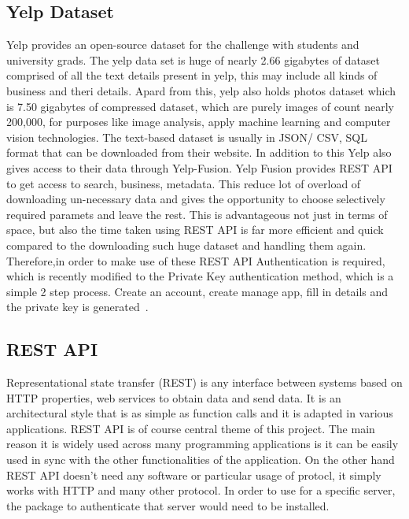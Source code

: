 \subsection{Yelp Dataset}

Yelp provides an open-source dataset for the challenge with students
and university grads. The yelp data set is huge of nearly 2.66
gigabytes of dataset comprised of all the text details present in
yelp, this may include all kinds of business and theri details. Apard
from this, yelp also holds photos dataset which is 7.50 gigabytes of
compressed dataset, which are purely images of count nearly 200,000,
for purposes like image analysis, apply machine learning and computer
vision technologies. The text-based dataset is usually in JSON/ CSV,
SQL format that can be downloaded from their website. In addition to
this Yelp also gives access to their data through Yelp-Fusion. Yelp
Fusion provides REST API to get access to search, business,
metadata. This reduce lot of overload of downloading un-necessary data
and gives the opportunity to choose selectively required paramets and
leave the rest. This is advantageous not just in terms of space, but
also the time taken using REST API is far more efficient and quick
compared to the downloading such huge dataset and handling them
again. Therefore,in order to make use of these REST API Authentication
is required, which is recently modified to the Private Key
authentication method, which is a simple 2 step process. Create an
account, create manage app, fill in details and the private key is
generated~\cite{hid-sp18-602-yelp}.

\subsection{REST API}

Representational state transfer (REST) is any interface between
systems based on HTTP properties, web services to obtain data and send
data. It is an architectural style that is as simple as function calls
and it is adapted in various applications. REST API is of course
central theme of this project. The main reason it is widely used
across many programming applications is it can be easily used in sync
with the other functionalities of the application. On the other hand
REST API doesn't need any software or particular usage of protocl, it
simply works with HTTP and many other protocol. In order to use for a
specific server, the package to authenticate that server would need to
be installed.

